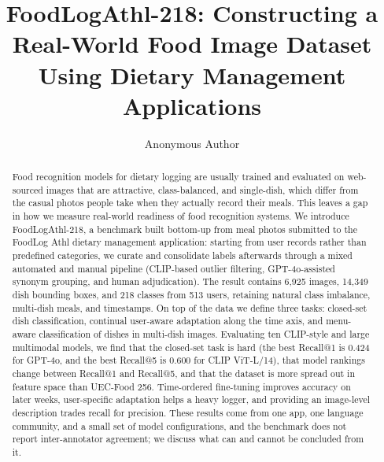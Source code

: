 \documentclass[sigconf, nonacm]{acmart}
\begin{document}
\title{FoodLogAthl-218: Constructing a Real-World Food Image Dataset\\ Using Dietary Management Applications}

\author{Anonymous Author}

\begin{abstract}
Food recognition models for dietary logging are usually trained and evaluated on web-sourced images that are attractive, class-balanced, and single-dish, which differ from the casual photos people take when they actually record their meals. This leaves a gap in how we measure real-world readiness of food recognition systems. We introduce FoodLogAthl-218, a benchmark built bottom-up from meal photos submitted to the FoodLog Athl dietary management application: starting from user records rather than predefined categories, we curate and consolidate labels afterwards through a mixed automated and manual pipeline (CLIP-based outlier filtering, GPT-4o-assisted synonym grouping, and human adjudication). The result contains 6,925 images, 14,349 dish bounding boxes, and 218 classes from 513 users, retaining natural class imbalance, multi-dish meals, and timestamps. On top of the data we define three tasks: closed-set dish classification, continual user-aware adaptation along the time axis, and menu-aware classification of dishes in multi-dish images. Evaluating ten CLIP-style and large multimodal models, we find that the closed-set task is hard (the best Recall@1 is 0.424 for GPT-4o, and the best Recall@5 is 0.600 for CLIP ViT-L/14), that model rankings change between Recall@1 and Recall@5, and that the dataset is more spread out in feature space than UEC-Food 256. Time-ordered fine-tuning improves accuracy on later weeks, user-specific adaptation helps a heavy logger, and providing an image-level description trades recall for precision. These results come from one app, one language community, and a small set of model configurations, and the benchmark does not report inter-annotator agreement; we discuss what can and cannot be concluded from it.
\end{abstract}

\maketitle
\end{document}
